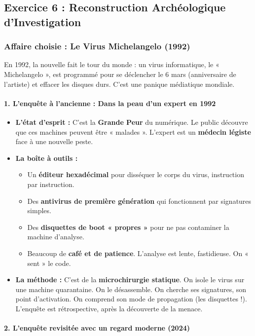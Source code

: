 \documentclass[12pt]{article}
\begin{document}
\subsection*{Exercice 6 : Reconstruction Archéologique d'Investigation}

\subsubsection{Affaire choisie : Le Virus Michelangelo (1992)}

En 1992, la nouvelle fait le tour du monde : un virus informatique, le « Michelangelo », est programmé pour se déclencher le 6 mars (anniversaire de l'artiste) et effacer les disques durs. C'est une panique médiatique mondiale.

\paragraph{1. L'enquête à l'ancienne : Dans la peau d'un expert en 1992}

\begin{itemize}
\item \textbf{L'état d'esprit :} C'est la \textbf{Grande Peur} du numérique. Le public découvre que ces machines peuvent être « malades ». L'expert est un \textbf{médecin légiste} face à une nouvelle peste.
\item \textbf{La boîte à outils :}
\begin{itemize}
\item Un \textbf{éditeur hexadécimal} pour disséquer le corps du virus, instruction par instruction.
\item Des \textbf{antivirus de première génération} qui fonctionnent par signatures simples.
\item Des \textbf{disquettes de boot « propres »} pour ne pas contaminer la machine d'analyse.
\item Beaucoup de \textbf{café et de patience}. L'analyse est lente, fastidieuse. On « sent » le code.
\end{itemize}
\item \textbf{La méthode :} C'est de la \textbf{microchirurgie statique}. On isole le virus sur une machine quarantaine. On le désassemble. On cherche ses signatures, son point d'activation. On comprend son mode de propagation (les disquettes !). L'enquête est rétrospective, après la découverte de la menace.
\end{itemize}

\paragraph{2. L'enquête revisitée avec un regard moderne (2024)}
\end{document}
